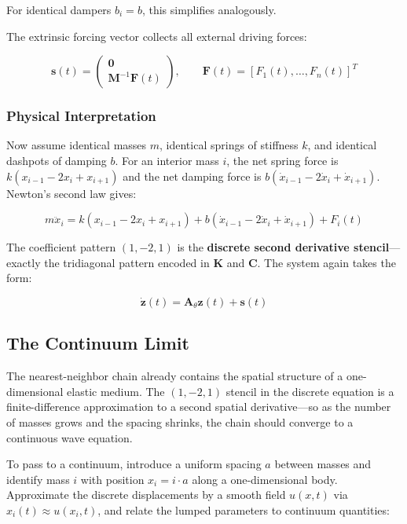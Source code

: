 \documentclass[
  letterpaper,
  DIV=11,
  numbers=noendperiod]{scrartcl}
\begin{document}
For identical dampers \(b_i = b\), this simplifies analogously.

The extrinsic forcing vector collects all external driving forces:

\[\mathbf{s}(t) = \begin{pmatrix} \mathbf{0} \\ \mathbf{M}^{-1}\mathbf{F}(t) \end{pmatrix}, \qquad \mathbf{F}(t) = [F_1(t), \ldots, F_n(t)]^T\]

\subsubsection{Physical Interpretation}\label{physical-interpretation}

Now assume identical masses \(m\), identical springs of stiffness \(k\),
and identical dashpots of damping \(b\). For an interior mass \(i\), the
net spring force is \(k(x_{i-1} - 2x_i + x_{i+1})\) and the net damping
force is \(b(\dot{x}_{i-1} - 2\dot{x}_i + \dot{x}_{i+1})\). Newton's
second law gives:

\[m\ddot{x}_i = k(x_{i-1} - 2x_i + x_{i+1}) + b(\dot{x}_{i-1} - 2\dot{x}_i + \dot{x}_{i+1}) + F_i(t)\]

The coefficient pattern \((1, -2, 1)\) is the \textbf{discrete second
derivative stencil}---exactly the tridiagonal pattern encoded in
\(\mathbf{K}\) and \(\mathbf{C}\). The system again takes the form:

\[\dot{\mathbf{z}}(t) = \mathbf{A}_\theta \mathbf{z}(t) + \mathbf{s}(t)\]

\subsection{The Continuum Limit}\label{the-continuum-limit}

The nearest-neighbor chain already contains the spatial structure of a
one-dimensional elastic medium. The \((1, -2, 1)\) stencil in the
discrete equation is a finite-difference approximation to a second
spatial derivative---so as the number of masses grows and the spacing
shrinks, the chain should converge to a continuous wave equation.

To pass to a continuum, introduce a uniform spacing \(a\) between masses
and identify mass \(i\) with position \(x_i = i \cdot a\) along a
one-dimensional body. Approximate the discrete displacements by a smooth
field \(u(x,t)\) via \(x_i(t) \approx u(x_i, t)\), and relate the lumped
parameters to continuum quantities:
\end{document}
